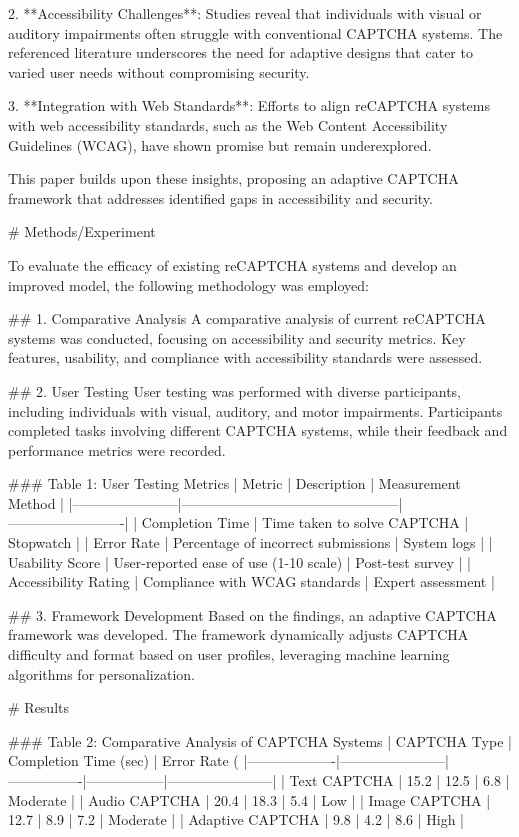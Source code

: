 2. **Accessibility Challenges**: Studies reveal that individuals with visual or auditory impairments often struggle with conventional CAPTCHA systems. The referenced literature underscores the need for adaptive designs that cater to varied user needs without compromising security.

3. **Integration with Web Standards**: Efforts to align reCAPTCHA systems with web accessibility standards, such as the Web Content Accessibility Guidelines (WCAG), have shown promise but remain underexplored.

This paper builds upon these insights, proposing an adaptive CAPTCHA framework that addresses identified gaps in accessibility and security.

# Methods/Experiment

To evaluate the efficacy of existing reCAPTCHA systems and develop an improved model, the following methodology was employed:

## 1. Comparative Analysis
A comparative analysis of current reCAPTCHA systems was conducted, focusing on accessibility and security metrics. Key features, usability, and compliance with accessibility standards were assessed.

## 2. User Testing
User testing was performed with diverse participants, including individuals with visual, auditory, and motor impairments. Participants completed tasks involving different CAPTCHA systems, while their feedback and performance metrics were recorded.

### Table 1: User Testing Metrics
| Metric                | Description                                    | Measurement Method      |
|-----------------------|-----------------------------------------------|-------------------------|
| Completion Time       | Time taken to solve CAPTCHA                   | Stopwatch               |
| Error Rate            | Percentage of incorrect submissions           | System logs             |
| Usability Score       | User-reported ease of use (1-10 scale)         | Post-test survey        |
| Accessibility Rating  | Compliance with WCAG standards                | Expert assessment       |

## 3. Framework Development
Based on the findings, an adaptive CAPTCHA framework was developed. The framework dynamically adjusts CAPTCHA difficulty and format based on user profiles, leveraging machine learning algorithms for personalization.

# Results

### Table 2: Comparative Analysis of CAPTCHA Systems
| CAPTCHA Type      | Completion Time (sec) | Error Rate (%
|-------------------|-----------------------|----------------|-----------------|-----------------------|
| Text CAPTCHA      | 15.2                 | 12.5           | 6.8             | Moderate              |
| Audio CAPTCHA     | 20.4                 | 18.3           | 5.4             | Low                  |
| Image CAPTCHA     | 12.7                 | 8.9            | 7.2             | Moderate              |
| Adaptive CAPTCHA  | 9.8                  | 4.2            | 8.6             | High                 |

